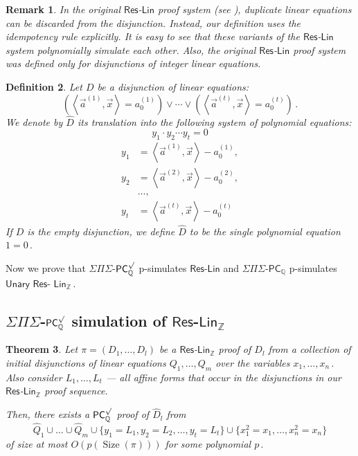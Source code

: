 \documentclass[11pt]{article}
\newtheorem{theorem}{Theorem}[section]
\newtheorem{definition}[theorem]{Definition}
\newtheorem{remark}[theorem]{Remark}
\newcommand{\Q}{{\mathbb Q}}
\newcommand{\Z}{{\mathbb Z}}
\DeclareMathOperator{\Size}{\mathrm{Size}}
\begin{document}
\begin{remark}
%
In the original $\mathsf{Res}$-$\mathsf{Lin}$ proof system (see  \cite{RT07}), duplicate linear equations can be discarded from the disjunction. Instead, our definition uses the \emph{idempotency} rule explicitly. It is easy to see that these variants of the $\mathsf{Res}$-$\mathsf{Lin}$ system polynomially simulate each other. Also, the original $\mathsf{Res}$-$\mathsf{Lin}$ proof system was defined only for disjunctions of \emph{integer} linear equations. %
\end{remark}




\begin{definition} 
Let $D$ be  a disjunction of linear equations:
\begin{equation*}
    \left(\left \langle \vec a^{(1)}, \vec x \right \rangle = a_0^{(1)}\right) \vee \cdots 
\vee \left(\left \langle \vec a^{(t)}, \vec x \right \rangle = a_0^{(t)}\right)\,. 
%
\end{equation*}
We denote by $\widehat{D} $ its translation into the following system of polynomial equations:
$$
   y_1 \cdot y_2 \cdots y_t = 0 
$$
\begin{align*}
    y_1 &= \left \langle \vec a^{(1)},  \vec x \right \rangle - a_0^{(1)}, \\ y_2 &=  \left \langle \vec a^{(2)}, \vec x \right \rangle - a_0^{(2)}, \\ &\ldots, \\  y_t &= \left \langle \vec a^{(t)}, \vec x \right \rangle - a_0^{(t)} %
\end{align*}
%
If $D$ is the empty disjunction, we define $\widehat{D} $ to be the single polynomial equation %
$1 = 0\,.$ %
%
\end{definition}

Now we prove that $\Sigma \Pi \Sigma$-$\mathsf{PC}_{\Q}^{\surd}$ p-simulates $\mathsf{Res}$-$\mathsf{Lin}$ and $\Sigma \Pi \Sigma$-$\mathsf{PC}_{\Q}$ p-simulates $\mathsf{Unary}$ $\mathsf{Res}$-%
$\mathsf{Lin}_\Z\,.$ %

\subsection{\texorpdfstring{$\Sigma \Pi \Sigma$-$\mathsf{PC}_\Q^{\surd}$}{SigmaPiSigma-PC-Q-sqrt}
 simulation of \texorpdfstring{$\mathsf{Res}$-$\mathsf{Lin}_{\Z}$}{Res-Lin-Z}}
\begin{theorem}
\label{Res-Lin-b simulation}
%
Let $\pi = (D_1, \ldots, D_l)$ be a $\mathsf{Res}$-$\mathsf{Lin}_{\Z}$ proof  of $D_l$ from a collection of initial disjunctions of linear equations $Q_1, \ldots, Q_m$ over the variables %
$x_1, \ldots, x_n\,.$ %
 Also consider $L_1, \ldots, L_t$ --- all affine forms that occur in the disjunctions in our $\mathsf{Res}$-$\mathsf{Lin}_\Z$ proof sequence. %

Then, there exists a $\mathsf{PC}_{\Q}^{\surd}$ proof of $\widehat{D}_l$ from 
$$
\widehat{Q}_1 \cup \ldots \cup \widehat{Q}_m \cup \{y_1 = L_1, y_2 = L_2, \ldots, y_t = L_t\} \cup \{x_1^2 = x_1, \ldots, x_n^2 = x_n\}
$$ 
of size at most $O(p(\Size(\pi)))$ for some polynomial %
$p\,.$ %
\end{theorem}
\end{document}
